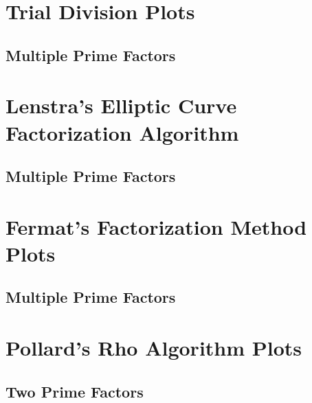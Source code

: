 \chapter{Trial Division Plots}

\section{Multiple Prime Factors}
\label{trialdivisionplots}













\chapter{Lenstra's Elliptic Curve Factorization Algorithm}
\section{Multiple Prime Factors}








\chapter{Fermat's Factorization Method Plots}
\section{Multiple Prime Factors}





\chapter{Pollard's Rho Algorithm Plots}

\section{Two Prime Factors}


